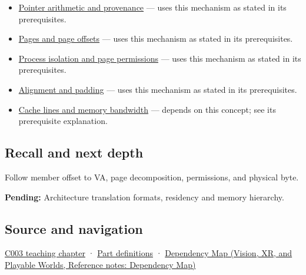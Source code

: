 \hypertarget{appendix-18ee4f913c3c-used-by}{}

\begin{itemize}
\item
  \hyperref[appendix-6af5921bc853]{Pointer arithmetic and provenance} --- uses this mechanism as stated in its prerequisites.
\item
  \hyperref[appendix-0c67cd5bf30a]{Pages and page offsets} --- uses this mechanism as stated in its prerequisites.
\item
  \hyperref[appendix-c2a9ad1e2b49]{Process isolation and page permissions} --- uses this mechanism as stated in its prerequisites.
\item
  \hyperref[appendix-a1f7c53b4742]{Alignment and padding} --- uses this mechanism as stated in its prerequisites.
\item
  \hyperref[appendix-e4ccdbab8320]{Cache lines and memory bandwidth} --- depends on this concept; see its prerequisite explanation.
\end{itemize}

\subsection{Recall and next depth}\label{appendix-18ee4f913c3c-recall-and-next-depth}

\hypertarget{appendix-18ee4f913c3c-recall-and-next-depth}{}

Follow member offset to VA, page decomposition, permissions, and physical byte.

\textbf{Pending:} Architecture translation formats, residency and memory hierarchy.

\subsection{Source and navigation}\label{appendix-18ee4f913c3c-source-and-navigation}

\hypertarget{appendix-18ee4f913c3c-source-and-navigation}{}

\hyperref[01-foundations-i-ch002-where-the-bytes-live]{C003 teaching chapter} · \hyperref[appendix-fd090d982a15-m003---parts-41-60]{Part definitions} · \href{../07-Vision-XR-and-Playable-Worlds/main.pdf\#nameddest=appendix-4ad47bdd269a}{Dependency Map (Vision, XR, and Playable Worlds, Reference notes: Dependency Map)}
